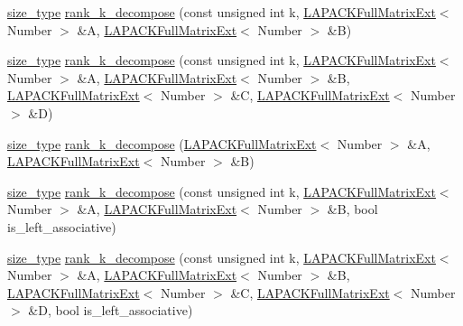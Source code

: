\begin{DoxyCompactItemize}
\item 
\hyperlink{classLAPACKFullMatrixExt_a5cf5f4a6104dc17029210b5ca52bf574}{size\+\_\+type} \hyperlink{classLAPACKFullMatrixExt_ab28877de241a7f5f901fa612c6352ce9}{rank\+\_\+k\+\_\+decompose} (const unsigned int k, \hyperlink{classLAPACKFullMatrixExt}{L\+A\+P\+A\+C\+K\+Full\+Matrix\+Ext}$<$ Number $>$ \&A, \hyperlink{classLAPACKFullMatrixExt}{L\+A\+P\+A\+C\+K\+Full\+Matrix\+Ext}$<$ Number $>$ \&B)
\item 
\hyperlink{classLAPACKFullMatrixExt_a5cf5f4a6104dc17029210b5ca52bf574}{size\+\_\+type} \hyperlink{classLAPACKFullMatrixExt_ae37081b41ac92e7c75e7f9b42422531f}{rank\+\_\+k\+\_\+decompose} (const unsigned int k, \hyperlink{classLAPACKFullMatrixExt}{L\+A\+P\+A\+C\+K\+Full\+Matrix\+Ext}$<$ Number $>$ \&A, \hyperlink{classLAPACKFullMatrixExt}{L\+A\+P\+A\+C\+K\+Full\+Matrix\+Ext}$<$ Number $>$ \&B, \hyperlink{classLAPACKFullMatrixExt}{L\+A\+P\+A\+C\+K\+Full\+Matrix\+Ext}$<$ Number $>$ \&C, \hyperlink{classLAPACKFullMatrixExt}{L\+A\+P\+A\+C\+K\+Full\+Matrix\+Ext}$<$ Number $>$ \&D)
\item 
\hyperlink{classLAPACKFullMatrixExt_a5cf5f4a6104dc17029210b5ca52bf574}{size\+\_\+type} \hyperlink{classLAPACKFullMatrixExt_af4406db24d0924c5f7e891336bfbcffe}{rank\+\_\+k\+\_\+decompose} (\hyperlink{classLAPACKFullMatrixExt}{L\+A\+P\+A\+C\+K\+Full\+Matrix\+Ext}$<$ Number $>$ \&A, \hyperlink{classLAPACKFullMatrixExt}{L\+A\+P\+A\+C\+K\+Full\+Matrix\+Ext}$<$ Number $>$ \&B)
\item 
\hyperlink{classLAPACKFullMatrixExt_a5cf5f4a6104dc17029210b5ca52bf574}{size\+\_\+type} \hyperlink{classLAPACKFullMatrixExt_aba252fd1854009998639c21c969909d8}{rank\+\_\+k\+\_\+decompose} (const unsigned int k, \hyperlink{classLAPACKFullMatrixExt}{L\+A\+P\+A\+C\+K\+Full\+Matrix\+Ext}$<$ Number $>$ \&A, \hyperlink{classLAPACKFullMatrixExt}{L\+A\+P\+A\+C\+K\+Full\+Matrix\+Ext}$<$ Number $>$ \&B, bool is\+\_\+left\+\_\+associative)
\item 
\hyperlink{classLAPACKFullMatrixExt_a5cf5f4a6104dc17029210b5ca52bf574}{size\+\_\+type} \hyperlink{classLAPACKFullMatrixExt_a935a8f39a295ca51844f5f6669e8dc32}{rank\+\_\+k\+\_\+decompose} (const unsigned int k, \hyperlink{classLAPACKFullMatrixExt}{L\+A\+P\+A\+C\+K\+Full\+Matrix\+Ext}$<$ Number $>$ \&A, \hyperlink{classLAPACKFullMatrixExt}{L\+A\+P\+A\+C\+K\+Full\+Matrix\+Ext}$<$ Number $>$ \&B, \hyperlink{classLAPACKFullMatrixExt}{L\+A\+P\+A\+C\+K\+Full\+Matrix\+Ext}$<$ Number $>$ \&C, \hyperlink{classLAPACKFullMatrixExt}{L\+A\+P\+A\+C\+K\+Full\+Matrix\+Ext}$<$ Number $>$ \&D, bool is\+\_\+left\+\_\+associative)

\end{DoxyCompactItemize}
